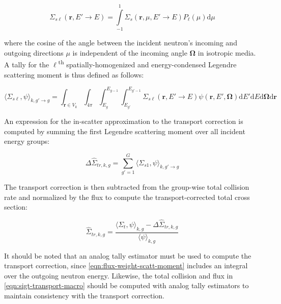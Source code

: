 \begin{equation}
\label{eqn:scatt-moment}
\Sigma_{s\ell}(\mathbf{r},E'\rightarrow E) = \displaystyle\int\limits_{-1}^{1} \Sigma_{s}(\mathbf{r},\mu,{E'\rightarrow E})P_{\ell}(\mu)\mathrm{d}\mu
\end{equation}

\noindent where the cosine of the angle between the incident neutron's incoming and outgoing directions $\mu$ is independent of the incoming angle $\mathbf{\Omega}$ in isotropic media. A tally for the $\ell$\textsuperscript{th} spatially-homogenized and energy-condensed Legendre scattering moment is thus defined as follows:

\begin{equation}
\label{eqn:flux-weight-scatt-moment}
\langle \Sigma_{s\ell}, \psi \rangle_{k,g'\rightarrow g} = \int_{\mathbf{r} \in V_{k}} \int_{4\pi} \int_{E_{g}}^{E_{g-1}} \int_{E_{g'}}^{E_{g'-1}} \Sigma_{s\ell}(\mathbf{r},E'\rightarrow E)\psi(\mathbf{r},E',\mathbf{\Omega}) \mathrm{d}E'\mathrm{d}E\mathrm{d}\mathbf{\Omega}\mathrm{d}\mathbf{r}
\end{equation}

An expression for the in-scatter approximation\cite{yamamoto2008simplified} to the transport correction is computed by summing the first Legendre scattering moment over all incident energy groups:

\begin{equation}
\label{eqn:transport-corr-macro}
\Delta\hat{\Sigma}_{tr,k,g} = \displaystyle\sum\limits_{g'=1}^{G} \langle{\Sigma_{s1}, \psi \rangle_{k,g'\rightarrow g}}
\end{equation}

\noindent The transport correction is then subtracted from the group-wise total collision rate and normalized by the flux to compute the transport-corrected total cross section:

\begin{equation}
\label{eqn:sigt-transport-macro}
\hat{\Sigma}_{tr,k,g} = \frac{\langle \Sigma_{t}, \psi \rangle_{k,g} - \Delta\hat{\Sigma}_{tr,k,g}}{\langle \psi \rangle_{k,g}}
\end{equation}

It should be noted that an analog tally estimator must be used to compute the transport correction, since \cref{eqn:flux-weight-scatt-moment} includes an integral over the outgoing neutron energy. Likewise, the total collision and flux in \cref{eqn:sigt-transport-macro} should be computed with analog tally estimators to maintain consistency with the transport correction.


